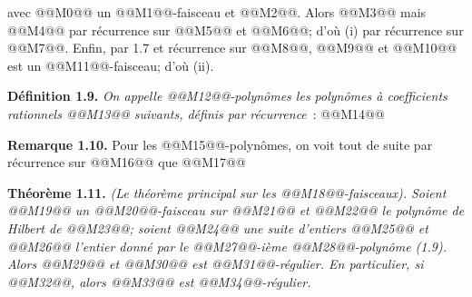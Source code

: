
avec @@M0@@ un @@M1@@-faisceau et @@M2@@. Alors
@@M3@@
mais
@@M4@@
par récurrence sur @@M5@@ et @@M6@@; d'où (i) par récurrence sur @@M7@@. Enfin, par 1.7 et récurrence sur @@M8@@, @@M9@@ et @@M10@@ est un @@M11@@-faisceau; d'où (ii).

\textbf{Définition 1.9.} \emph{On appelle \emph{@@M12@@-polynômes} les polynômes à coefficients rationnels @@M13@@ suivants, définis par récurrence}~:
@@M14@@

\textbf{Remarque 1.10.} Pour les @@M15@@-polynômes, on voit tout de suite par récurrence sur @@M16@@ que
@@M17@@

\textbf{Théorème 1.11.} \emph{(Le théorème principal sur les @@M18@@-faisceaux). Soient @@M19@@ un @@M20@@-faisceau sur @@M21@@ et @@M22@@ le polynôme de Hilbert de @@M23@@; soient @@M24@@ une suite d'entiers @@M25@@ et @@M26@@ l'entier donné par le @@M27@@-ième @@M28@@-polynôme (1.9). Alors @@M29@@ et @@M30@@ est @@M31@@-régulier. En particulier, si @@M32@@, alors @@M33@@ est @@M34@@-régulier.}


